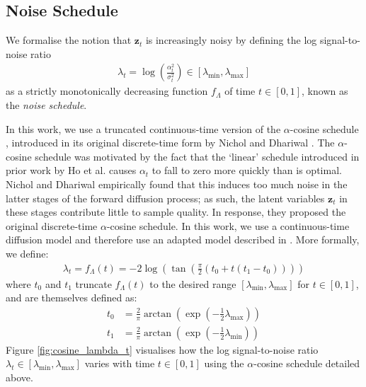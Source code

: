\documentclass[ oneside,%
                    author={George Herbert},
                    degree={MSci},
                     title={Video Diffusion Models for Climate Simulations},
                  subtitle={}]{dissertation}
\begin{document}
\subsection{Noise Schedule}
\label{sec:background_diffusion_noise_schedule}

We formalise the notion that $\mathbf{z}_t$ is increasingly noisy by defining the log signal-to-noise ratio
\begin{align}
      \lambda_t = \log\left( \frac{\alpha_t^2}{\sigma_t^2}\right)\in[\lambda_{\min}, \lambda_{\max}]
\end{align}
as a strictly monotonically decreasing function $f_{\Lambda}$ of time $t\in[0, 1]$, known as the \textit{noise schedule}.

In this work, we use a truncated continuous-time version of the $\alpha$-cosine schedule \cite{IDDPM_Nichol}, introduced in its original discrete-time form by Nichol and Dhariwal \cite{IDDPM_Nichol}. The $\alpha$-cosine schedule was motivated by the fact that the `linear' schedule introduced in prior work by Ho et al. \cite{DDPM_Ho} causes $\alpha_t$ to fall to zero more quickly than is optimal. Nichol and Dhariwal empirically found that this induces too much noise in the latter stages of the forward diffusion process; as such, the latent variables $\mathbf{z}_t$ in these stages contribute little to sample quality. In response, they proposed the original discrete-time $\alpha$-cosine schedule. In this work, we use a continuous-time diffusion model and therefore use an adapted model described in \cite{Simple_Diffusion_Hoogeboom}. More formally, we define:
\begin{align}
      \lambda_t=f_{\Lambda}(t)=-2\log\left(\tan\left(\frac{\pi}{2}(t_0+t(t_1-t_0))\right)\right)
      \label{eq:f_lambda_alpha_cosine}
\end{align} 
where $t_0$ and $t_1$ truncate $f_{\Lambda}(t)$ to the desired range $[\lambda_{\min}, \lambda_{\max}]$ for $t\in[0,1]$, and are themselves defined as:
\begin{align}
      t_0&=\frac{2}{\pi}\arctan\left(\exp\left(-\frac{1}{2}\lambda_{\max}\right)\right)\\
      t_1&=\frac{2}{\pi}\arctan\left(\exp\left(-\frac{1}{2}\lambda_{\min}\right)\right)
\end{align}
Figure \ref{fig:cosine_lambda_t} visualises how the log signal-to-noise ratio $\lambda_t\in[\lambda_{\min},\lambda_{\max}]$ varies with time $t\in[0,1]$ using the $\alpha$-cosine schedule detailed above.
\end{document}
